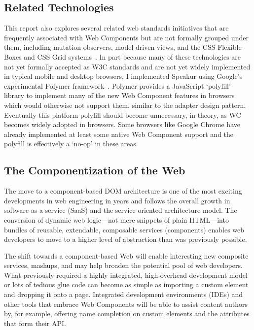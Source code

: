 \subsection{Related Technologies}
This report also explores several related web standards initiatives that are frequently associated with Web Components 
but are not formally grouped under them, including mutation observers,
model driven views, 
and the CSS Flexible Boxes
and CSS Grid
systems~\cite{w3ccontributors2014,w3ccontributors2015-d,mozillacontributors2015}. 
In part because many of these technologies are not yet formally accepted as W3C standards and are not yet widely implemented in typical mobile and desktop browsers, 
I implemented Speakur using Google's experimental Polymer framework~\cite{polymercontributors2015}.
Polymer provides a JavaScript `polyfill'
library to implement many of the new Web Component features in browsers which would otherwise not support them, 
similar to the adapter design pattern. 
Eventually this platform polyfill should become unnecessary, in theory, as WC becomes widely adopted in browsers.
Some browsers like Google Chrome 
have already implemented at least some native 
Web Component support 
and the polyfill is effectively a `no-op' in these areas.

\subsection{The Componentization of the Web}
The move to a component-based DOM architecture is one of the most exciting developments in web engineering in years and follows the overall growth in software-as-a-service (SaaS) 
and the service oriented architecture
model. 
The conversion of dynamic web logic---not mere snippets of plain HTML---into bundles of reusable, extendable, composable services (components) enables web developers to move to a higher level of abstraction than was previously possible.

The shift towards a component-based Web will enable interesting new composite services, mashups, and may help broaden the potential pool of web developers. 
What previously required a highly integrated, high-overhead development model or lots of tedious glue code can become as simple as importing a custom element and dropping it onto a page.
Integrated development environments (IDEs) and other tools that embrace Web Components will be able to assist content authors by, for example, offering name completion on custom elements and the attributes that form their API.

